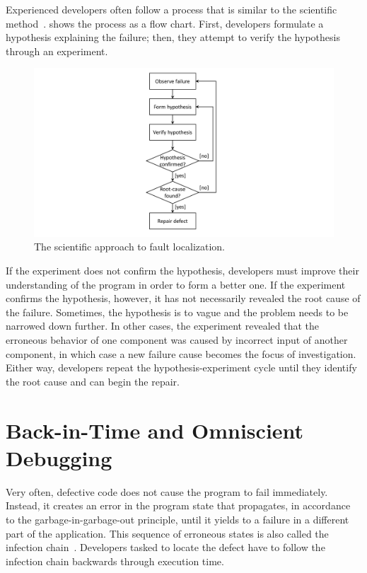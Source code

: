 Experienced developers often follow a process that is similar to the scientific method~\cite{araki91:a_general_framework}.
 shows the process as a flow chart.
First, developers formulate a hypothesis explaining the failure; then, they attempt to verify the hypothesis through an experiment. 
\begin{figure}[t]
\centering
\includegraphics[width=.4\linewidth]{img/workflow-scientific-method}
\caption{The scientific approach to fault localization.}
\label{fig:scientifiy-method}
\end{figure}
If the experiment does not confirm the hypothesis, developers must improve their understanding of the program in order to form a better one.
If the experiment confirms the hypothesis, however, it has not necessarily revealed the root cause of the failure.
Sometimes, the hypothesis is to vague and the problem needs to be narrowed down further.
In other cases, the experiment revealed that the erroneous behavior of one component was caused by incorrect input of another component, in which case a new failure cause becomes the focus of investigation.
Either way, developers repeat the hypothesis-experiment cycle until they identify the root cause and can begin the repair.

\section{Back-in-Time and Omniscient Debugging}
\label{sec:omni-debugging}

Very often, defective code does not cause the program to fail immediately.
Instead, it creates an error in the program state that propagates, in accordance to the garbage-in-garbage-out principle, until it yields to a failure in a different part of the application.
This sequence of erroneous states is also called the infection chain~\cite{zeller09:why_programs_fail}.
Developers tasked to locate the defect have to follow the infection chain backwards through execution time.


